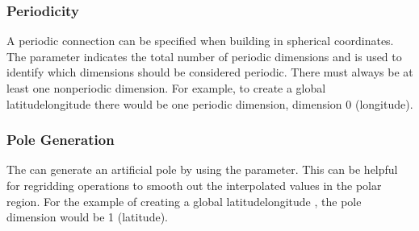 \documentclass[letterpaper,10pt,english]{sphinxmanual}
\begin{document}
\subsubsection{Periodicity}
\label{\detokenize{api:periodicity}}
A periodic connection can be specified when building {\hyperref[\detokenize{grid:ESMF.api.grid.Grid}]{}} in spherical
coordinates. The  parameter indicates the total number of
periodic dimensions and  is used to identify which dimensions
should be considered periodic. There must always be at least one non\sphinxhyphen{}periodic
dimension. For example, to create a global latitude\sphinxhyphen{}longitude {\hyperref[\detokenize{grid:ESMF.api.grid.Grid}]{}} there would
be one periodic dimension, dimension 0 (longitude).

\begin{sphinxVerbatim}[commandchars=\\\{\}]
  \PYG{p}{[}\PYG{p}{]} 
                     
\end{sphinxVerbatim}


\subsubsection{Pole Generation}
\label{\detokenize{api:pole-generation}}
The {\hyperref[\detokenize{grid:ESMF.api.grid.Grid}]{}} can generate an artificial pole by using the  parameter. This
can be helpful for regridding operations to smooth out the interpolated values
in the polar region. For the example of creating a global latitude\sphinxhyphen{}longitude
{\hyperref[\detokenize{grid:ESMF.api.grid.Grid}]{}}, the pole dimension would be 1 (latitude).
\end{document}
